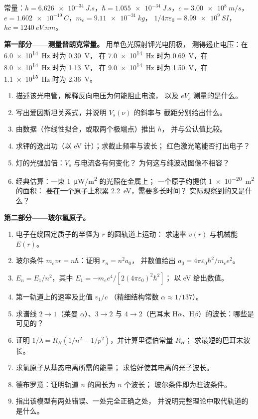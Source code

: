 \begin{problem}
\label{pb:b1:quantum-introduction:1}
常量：$h = \qty{6.626e-34}{J.s}$，$\hbar = \qty{1.055e-34}{J.s}$，$c =
\qty{3.00e8}{m/s}$，$e = \qty{1.602e-19}{C}$，$m_e = \qty{9.11e-31}{kg}$，
$1/4\pi\varepsilon_0 = \qty{8.99e9}{SI}$，$hc = \qty{1240}{eV.nm}$。

\medskip
\noindent\textbf{第一部分——测量普朗克常量。}
用单色光照射钾光电阴极，
测得遏止电压：在 \qty{6.0e14}{Hz} 时为 \qty{0.30}{V}，
在 \qty{7.0e14}{Hz} 时为 \qty{0.69}{V}，在 \qty{8.0e14}{Hz} 时为 \qty{1.13}{V}，
在 \qty{9.0e14}{Hz} 时为 \qty{1.50}{V}，在 \qty{1.1e15}{Hz} 时为 \qty{2.36}{V}。
\begin{enumerate}
  \item 描述该光电管，解释反向电压为何能阻止电流，
        以及 $eV_s$ 测量的是什么。
  \item 写出爱因斯坦关系式，并说明 $V_s(\nu)$ 的斜率与
        截距分别给出什么。
  \item 由数据（作线性拟合，或取两个极端点）推出 $h$，
        并与公认值比较。
  \item 求钾的逸出功（以 eV 计）；求截止频率与波长；
        红色激光笔能否打出电子？
  \item 灯的光强加倍：$V_s$ 与电流各有何变化？
        为何这与纯波动图像不相容？
  \item 经典估算：一束 \qty{1}{\micro W/m^2} 的光照在金属上；
        一个原子约提供 \qty{1e-20}{m^2} 的面积：
        要在一个原子上积累 \qty{2.2}{eV}，需要多长时间？
        实际观察到的又是什么？
\end{enumerate}

\medskip
\noindent\textbf{第二部分——玻尔氢原子。}
\begin{enumerate}[resume]
  \item 电子在绕固定质子的半径为 $r$ 的圆轨道上运动：
        求速率 $v(r)$ 与机械能 $E(r)$。
  \item 玻尔条件 $m_evr = n\hbar$：证明 $r_n = n^2a_0$，
        并数值给出 $a_0 = 4\pi\varepsilon_0\hbar^2/m_ee^2$。
  \item $E_n = E_1/n^2$，其中 $E_1 = -m_ee^4/[2(4\pi\varepsilon_0)^2\hbar^2]$；
        以 eV 给出数值。
  \item 第一轨道上的速率及比值 $v_1/c$
        （精细结构常数 $\alpha \approx 1/137$）。
  \item 求谱线 $2 \to 1$（莱曼 $\alpha$）、$3 \to 2$
        与 $4 \to 2$（巴耳末 H$\alpha$、H$\beta$）的波长：哪些是可见的？
  \item 证明 $1/\lambda = R_H(1/n^2 - 1/p^2)$，并计算里德伯常量 $R_H$；
        求最短的巴耳末波长。
  \item 求氢原子从基态电离所需的能量；
        求恰好使其电离的光子波长。
  \item 德布罗意：证明轨道 $n$ 的周长为 $n$ 个波长；
        玻尔条件即为驻波条件。
  \item 指出该模型有两处错误、一处完全正确之处，
        并说明完整理论中取代轨道的是什么。
\end{enumerate}


\end{problem}
